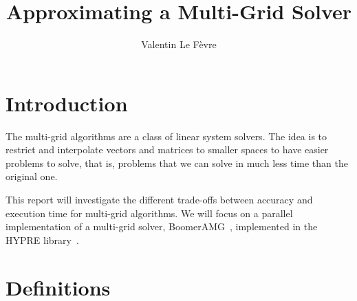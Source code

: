 \documentclass[a4paper,10pt]{article}
\title{Approximating a Multi-Grid Solver}
\author{Valentin Le Fèvre}
\begin{document}
\maketitle

\section{Introduction}

The multi-grid algorithms are a class of linear system solvers.
The idea is to restrict and interpolate vectors and matrices to smaller spaces to have easier problems to solve, that is, problems that we can solve in much less time than the original one.

This report will investigate the different trade-offs between accuracy and execution time for multi-grid algorithms.
We will focus on a parallel implementation of a multi-grid solver, BoomerAMG~\cite{boomerAMG}, implemented in the HYPRE library~\cite{Falgout2002}.

\section{Definitions}
\end{document}
